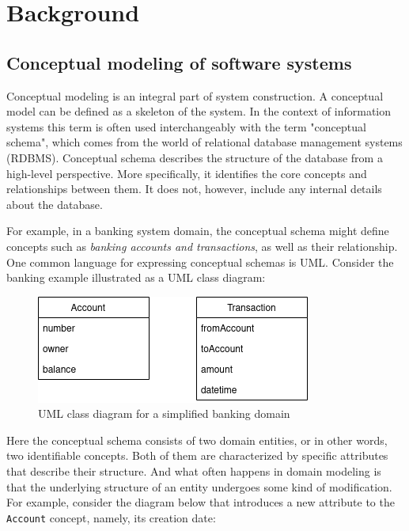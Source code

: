\chapter{Background}

\section{Conceptual modeling of software systems}

Conceptual modeling is an integral part of system construction. A conceptual model can be defined as a skeleton of the system. In the context of information systems this term is often used interchangeably with the term "conceptual schema", which comes from the world of relational database management systems (RDBMS). Conceptual schema describes the structure of the database from a high-level perspective. More specifically, it identifies the core concepts and relationships between them. It does not, however, include any internal details about the database.

For example, in a banking system domain, the conceptual schema might define concepts such as \textit{banking accounts and transactions}, as well as their relationship. One common language for expressing conceptual schemas is UML. Consider the banking example illustrated as a UML class diagram:

\n

\begin{figure}[H]\centering
    \includegraphics[scale=0.65]{images/banking.drawio.png}
    \caption{UML class diagram for a simplified banking domain}\label{fig:bank}
\end{figure}

Here the conceptual schema consists of two domain entities, or in other words, two identifiable concepts. Both of them are characterized by specific attributes that describe their structure. And what often happens in domain modeling is that the underlying structure of an entity undergoes some kind of modification. For example, consider the diagram below that introduces a new attribute to the \texttt{Account} concept, namely, its creation date:

